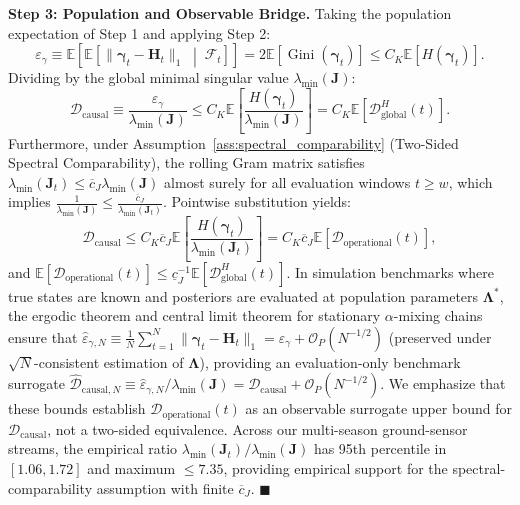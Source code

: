 \documentclass[twoside]{article}
\theoremstyle{definition}
\newcommand{\E}{\mathbb{E}}
\begin{document}
\textbf{Step 3: Population and Observable Bridge.}
Taking the population expectation of Step 1 and applying Step 2:
\begin{equation}
    \varepsilon_\gamma \equiv \E\left[ \E\left[ \|\boldsymbol{\gamma}_t - \boldsymbol{H}_t\|_1 \;\middle|\; \mathcal{F}_t \right] \right] = 2 \E[\operatorname{Gini}(\boldsymbol{\gamma}_t)] \le C_K \E[H(\boldsymbol{\gamma}_t)].
\end{equation}
Dividing by the global minimal singular value $\lambda_{\min}(\boldsymbol{J})$:
\begin{equation}
    \mathcal{D}_{\mathrm{causal}} \equiv \frac{\varepsilon_\gamma}{\lambda_{\min}(\boldsymbol{J})} \le C_K \E\left[ \frac{H(\boldsymbol{\gamma}_t)}{\lambda_{\min}(\boldsymbol{J})} \right] = C_K \E[\mathcal{D}_{\mathrm{global}}^H(t)].
\end{equation}
Furthermore, under Assumption~\ref{ass:spectral_comparability} (Two-Sided Spectral Comparability), the rolling Gram matrix satisfies $\lambda_{\min}(\boldsymbol{J}_t) \le \overline{c}_J \lambda_{\min}(\boldsymbol{J})$ almost surely for all evaluation windows $t \ge w$, which implies $\frac{1}{\lambda_{\min}(\boldsymbol{J})} \le \frac{\overline{c}_J}{\lambda_{\min}(\boldsymbol{J}_t)}$. Pointwise substitution yields:
\begin{equation}
    \mathcal{D}_{\mathrm{causal}} \le C_K \overline{c}_J \E\left[ \frac{H(\boldsymbol{\gamma}_t)}{\lambda_{\min}(\boldsymbol{J}_t)} \right] = C_K \overline{c}_J \E[\mathcal{D}_{\mathrm{operational}}(t)],
\end{equation}
and $\E[\mathcal{D}_{\mathrm{operational}}(t)] \le \underline{c}_J^{-1} \E[\mathcal{D}_{\mathrm{global}}^H(t)]$. In simulation benchmarks where true states are known and posteriors are evaluated at population parameters $\boldsymbol{\Lambda}^*$, the ergodic theorem and central limit theorem for stationary $\alpha$-mixing chains ensure that $\hat{\varepsilon}_{\gamma, N} \equiv \frac{1}{N}\sum_{t=1}^N \|\boldsymbol{\gamma}_t - \boldsymbol{H}_t\|_1 = \varepsilon_\gamma + \mathcal{O}_P(N^{-1/2})$ (preserved under $\sqrt{N}$-consistent estimation of $\boldsymbol{\Lambda}$), providing an evaluation-only benchmark surrogate $\hat{\mathcal{D}}_{\mathrm{causal}, N} \equiv \hat{\varepsilon}_{\gamma, N}/\lambda_{\min}(\boldsymbol{J}) = \mathcal{D}_{\mathrm{causal}} + \mathcal{O}_P(N^{-1/2})$. We emphasize that these bounds establish $\mathcal{D}_{\mathrm{operational}}(t)$ as an observable surrogate upper bound for $\mathcal{D}_{\mathrm{causal}}$, not a two-sided equivalence. Across our multi-season ground-sensor streams, the empirical ratio $\lambda_{\min}(\boldsymbol{J}_t)/\lambda_{\min}(\boldsymbol{J})$ has 95th percentile in $[1.06, 1.72]$ and maximum $\le 7.35$, providing empirical support for the spectral-comparability assumption with finite $\overline{c}_J$. $\blacksquare$
\end{document}
